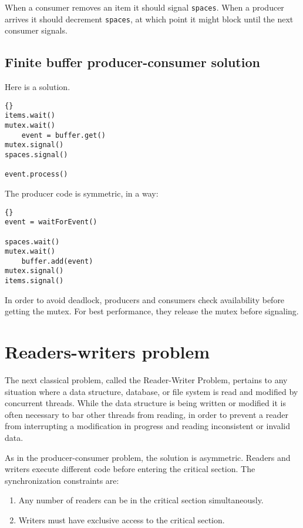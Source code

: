 \documentclass{book}
\newcommand{\clearemptydoublepage}{\newpage\cleardoublepage}
\begin{document}
When a consumer removes an item it should signal {\tt spaces}.
When a producer arrives it should decrement {\tt spaces}, at
which point it might block until the next consumer signals.


\clearemptydoublepage
\subsection{Finite buffer producer-consumer solution}

Here is a solution.

\begin{lstlisting}[title={Finite buffer consumer solution}]{}
items.wait()
mutex.wait()
    event = buffer.get()
mutex.signal()
spaces.signal()

event.process()
\end{lstlisting}

The producer code is symmetric, in a way:

\begin{lstlisting}[title={Finite buffer producer solution}]{}
event = waitForEvent()

spaces.wait()
mutex.wait()
    buffer.add(event)
mutex.signal()
items.signal()
\end{lstlisting}

In order to avoid deadlock, producers and consumers check
availability before getting the mutex.  For best performance,
they release the mutex before signaling.


\section{Readers-writers problem} 

The next classical problem, called the Reader-Writer Problem, pertains
to any situation where a data structure, database, or file system is
read and modified by concurrent threads.  While the data structure is
being written or modified it is often necessary to bar other threads
from reading, in order to prevent a reader from interrupting a
modification in progress and reading inconsistent or invalid data.

As in the producer-consumer problem, the solution is asymmetric.
Readers and writers execute different code before entering the
critical section.  The synchronization constraints are:

\begin{enumerate}

\item Any number of readers can be in the critical section
simultaneously.

\item Writers must have exclusive access to the critical section.

\end{enumerate}
\end{document}
